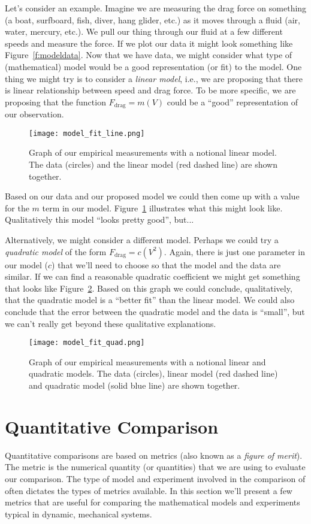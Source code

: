 Let's consider an example.  Imagine we are measuring the drag force on something (a boat, surfboard, fish, diver, hang glider, etc.) as it moves through a fluid (air, water, mercury, etc.).  We pull our thing through our fluid at a few different speeds and measure the force.  If we plot our data it might look something like Figure~\ref{f:modeldata}.  Now that we have data, we might consider what type of (mathematical) model would be a good representation (or fit) to the model.  One thing we might try is to consider a \emph{linear model}, i.e., we are proposing that there is linear relationship between speed and drag force.  To be more specific, we are proposing that the function $F_{\mathrm{drag}}=m(V)$ could be a ``good'' representation of our observation.
\begin{figure}[hb!]
\centering
\texttt{[image: model\_fit\_line.png]}
\caption{Graph of our empirical measurements with a notional linear model.  The data (circles) and the linear model (red dashed line) are shown together.}
\label{f:modelline}
\end{figure}
Based on our data and our proposed model we could then come up with a value for the $m$ term in our model.  Figure~\ref{f:modelline} illustrates what this might look like.  Qualitatively this model ``looks pretty good'', but...

Alternatively, we might consider a different model.  Perhaps we could try a \emph{quadratic model} of the form $F_{\mathrm{drag}}=c(V^2)$.  Again, there is just one parameter in our model ($c$) that we'll need to choose so that the model and the data are similar. If we can find a reasonable quadratic coefficient we might get something that looks like Figure~\ref{f:modelquad}.  Based on this graph we could conclude, qualitatively, that the quadratic model is a ``better fit'' than the linear model.  We could also conclude that the error between the quadratic model and the data is ``small'', but we can't really get beyond these qualitative explanations.

\begin{figure}[bh!]
\centering
\texttt{[image: model\_fit\_quad.png]}
\caption{Graph of our empirical measurements with a notional linear and quadratic models.  The data (circles), linear model (red dashed line) and quadratic model (solid blue line) are shown together.}
\label{f:modelquad}
\end{figure}


\section{Quantitative Comparison}
Quantitative comparisons are based on \glspl{metric} (also known as a \emph{figure of merit}).  The metric is the numerical quantity (or quantities) that we are using to evaluate our comparison.  The type of model and experiment involved in the comparison of often dictates the types of metrics available.  In this section we'll present a few metrics that are useful for comparing the mathematical models and experiments typical in dynamic, mechanical systems.

